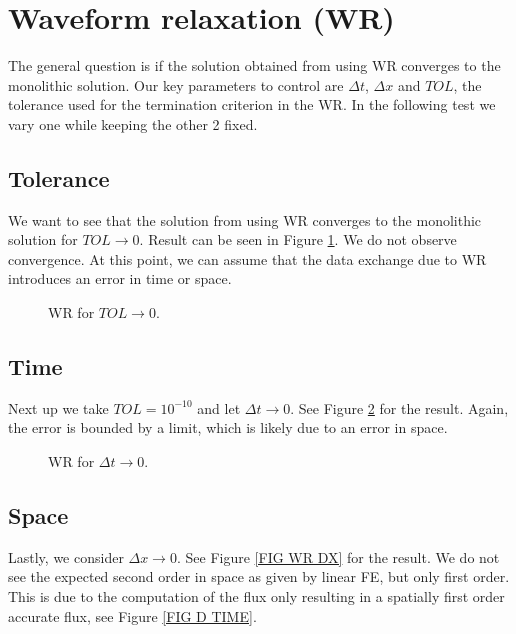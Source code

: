 \documentclass[a4paper,10pt]{article}
\begin{document}
\section{Waveform relaxation (WR)}
The general question is if the solution obtained from using WR converges to the monolithic solution. Our key parameters to control are $\Delta t$, $\Delta x$ and $TOL$, the tolerance used for the termination criterion in the WR. In the following test we vary one while keeping the other 2 fixed. 
% 
\FloatBarrier
\subsection{Tolerance}
We want to see that the solution from using WR converges to the monolithic solution for $TOL \rightarrow 0$. Result can be seen in Figure \ref{FIG WR TOL}. We do not observe convergence. At this point, we can assume that the data exchange due to WR introduces an error in time or space.

\begin{figure}[ht!]
\label{FIG WR TOL}
\caption{WR for $TOL \rightarrow 0$.}
\end{figure}
% 
\FloatBarrier
\subsection{Time}
Next up we take $TOL = 10^{-10}$ and let $\Delta t \rightarrow 0$. See Figure \ref{FIG WR DT} for the result. Again, the error is bounded by a limit, which is likely due to an error in space.

\begin{figure}[ht!]
\label{FIG WR DT}
\caption{WR for $\Delta t \rightarrow 0$.}
\end{figure}
% 
\FloatBarrier
\subsection{Space}
Lastly, we consider $\Delta x \rightarrow 0$. See Figure \ref{FIG WR DX} for the result. We do not see the expected second order in space as given by linear FE, but only first order. This is due to the computation of the flux only resulting in a spatially first order accurate flux, see Figure \ref{FIG D TIME}.
\end{document}
